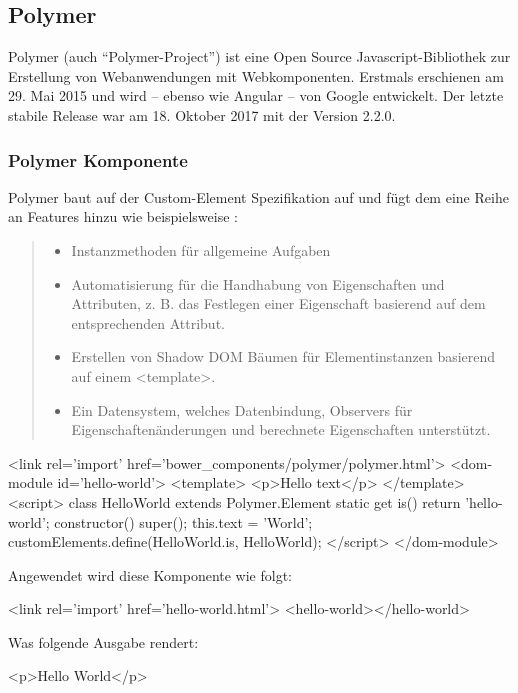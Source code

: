 \subsection{Polymer }
Polymer (auch "`Polymer-Project"') ist eine Open Source Javascript-Bibliothek zur Erstellung von Webanwendungen mit Webkomponenten. Erstmals erschienen am 29. Mai 2015 und  wird -- ebenso wie Angular -- von Google entwickelt. Der letzte stabile Release war am 18. Oktober 2017 mit der Version 2.2.0.\\

\subsubsection{Polymer Komponente}
Polymer baut auf der Custom-Element Spezifikation auf und fügt dem eine Reihe an Features hinzu wie beispielsweise \cite{polymer-elements}:
\begin{quote}
\begin{itemize}
	\item Instanzmethoden für allgemeine Aufgaben
	\item Automatisierung für die Handhabung von Eigenschaften und Attributen, z. B. das Festlegen einer Eigenschaft basierend auf dem entsprechenden Attribut.
	\item Erstellen von Shadow DOM Bäumen für Elementinstanzen basierend auf einem <template>.
	\item Ein Datensystem, welches Datenbindung, Observers für Eigenschaftenänderungen und berechnete Eigenschaften unterstützt.
\end{itemize}
\end{quote}
\begin{JsCode}
<link rel='import' href='bower_components/polymer/polymer.html'>
<dom-module id='hello-world'>
	<template>
		<p>Hello {{text}}</p>
	</template>
	<script>
		class HelloWorld extends Polymer.Element {
			static get is() {
				return 'hello-world';
			}
			constructor() {
				super();
				this.text = 'World';
			}
		}
		customElements.define(HelloWorld.is, HelloWorld);
	</script>
</dom-module>
\end{JsCode}
Angewendet wird diese Komponente wie folgt:
\begin{JsCode}[numbers=none]
	<link rel='import' href='hello-world.html'>
	<hello-world></hello-world>
\end{JsCode}
Was folgende Ausgabe rendert:
\begin{JsCode}Hello World</p>
\end{JsCode}

